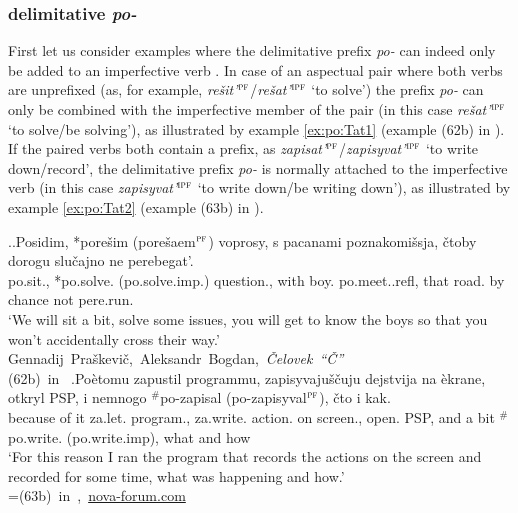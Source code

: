 \subsubsection{delimitative  \textit{po-}  }
First let us consider examples where the delimitative  prefix \textit{po-}   can indeed only be added to an imperfective verb . In case of an aspectual pair  where both verbs are unprefixed (as, for example, \textit{re\v{s}it'}$^{\textsc{pf}}$\slash\textit{re\v{s}at'}$^{\textsc{ipf}}$ `to solve') the prefix \textit{po-}   can only be combined with the imperfective member of the pair (in this case \textit{re\v{s}at'}$^{\textsc{ipf}}$ `to solve/be solving'), as illustrated by example \ref{ex:po:Tat1} (example (62b) in \citealt[121]{Tatevosov:09}). If the paired verbs both contain a prefix, as \textit{zapisat'}$^{\textsc{pf}}$\slash\textit{zapisyvat'}$^{\textsc{ipf}}$ `to write down/record', the delimitative  prefix \textit{po-}   is normally attached to the imperfective verb  (in this case \textit{zapisyvat'}$^{\textsc{ipf}}$ `to write down/be writing down'), as illustrated by example \ref{ex:po:Tat2} (example (63b) in \citealt[121]{Tatevosov:09}).

\ex.\label{ex:po:Tat}\ag.\label{ex:po:Tat1}Posidim, *pore\v{s}im (\textsuperscript{\JudgeOK}pore\v{s}aem$^{\textsc{pf}}$) voprosy, s pacanami poznakomi\v{s}sja, \v{c}toby dorogu slu\v{c}ajno ne perebegat'.\\
po.sit., *po.solve. (\textsuperscript{\JudgeOK}po.solve.imp.) question., with boy. po.meet..refl, that road. {by chance} not pere.run.\\
\trans `We will sit a bit, solve some issues, you will get to know the boys so that you won't accidentally cross their way.'\\\hbox{}\hfill\hbox{Gennadij Pra\v{s}kevi\v{c}, Aleksandr Bogdan, \textit{\v{C}elovek ``\v{C}''}}\\\hbox{}\hfill\hbox{(62b) in \citet{Tatevosov:09}}
\bg.\label{ex:po:Tat2}Po\`{e}tomu zapustil programmu, zapisyvaju\v{s}\v{c}uju dejstvija na \`{e}krane, otkryl PSP, i nemnogo $^\#$po-zapisal (\textsuperscript{\JudgeOK}po-zapisyval$^{\textsc{pf}}$), \v{c}to i kak.\\
{because of it} za.let. program., za.write. action. on screen., open. PSP, and {a bit} $^\#$po.write. (\textsuperscript{\JudgeOK}po.write.imp), what and how\\
\trans `For this reason I ran the program that records the actions on the screen and recorded for some time, what was happening and how.'\\\hbox{}\hfill\hbox{=(63b) in \citet{Tatevosov:09}, \url{nova-forum.com}}

